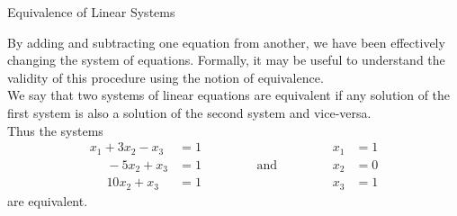 \documentclass[smaller,hyperref={CJKbookmarks=true}]{beamer}
\begin{document}
\begin{frame}{Equivalence of Linear Systems} \begin{spacing}{1}
By adding and subtracting one equation from another, we have been
ef{}fectively changing the system of equations. Formally, it may be useful to
understand the validity of this procedure using the notion of equivalence.\\[4pt]
We say that two systems of linear equations are equivalent if any solution
of the first system is also a solution of the second system and vice-versa.\\[4pt]
Thus the systems
\begin{equation*}
  \begin{aligned}
  x_1+3x_2-x_3&=1\\
  ~~~~~~-5x_2+x_3&=1\\
  ~~~~~~10x_2+x_3&=1
  \end{aligned}
  \qquad\qquad\text{and}\qquad\qquad
  \begin{aligned}
  x_1&=1\\x_2&=0\\x_3&=1
  \end{aligned}
\end{equation*} are equivalent.
\end{spacing}
\end{frame}
\end{document}
